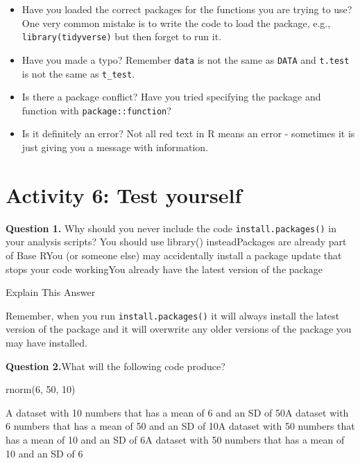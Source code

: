 \documentclass[
  oneside]{book}
\newenvironment{Shaded}{\begin{snugshade}}{\end{snugshade}}
\newcommand{\DecValTok}[1]{\textcolor[rgb]{0.00,0.00,0.81}{#1}}
\newcommand{\FunctionTok}[1]{\textcolor[rgb]{0.00,0.00,0.00}{#1}}
\newcommand{\NormalTok}[1]{#1}
\providecommand{\tightlist}{%
  \setlength{\itemsep}{0pt}\setlength{\parskip}{0pt}}
\begin{document}
\begin{itemize}
\tightlist
\item
  Have you loaded the correct packages for the functions you are trying to use? One very common mistake is to write the code to load the package, e.g., \texttt{library(tidyverse)} but then forget to run it.
\item
  Have you made a typo? Remember \texttt{data} is not the same as \texttt{DATA} and \texttt{t.test} is not the same as \texttt{t\_test}.
\item
  Is there a package conflict? Have you tried specifying the package and function with \texttt{package::function}?
\item
  Is it definitely an error? Not all red text in R means an error - sometimes it is just giving you a message with information.
\end{itemize}

\hypertarget{activity-6-test-yourself}{%
\section{Activity 6: Test yourself}\label{activity-6-test-yourself}}

\textbf{Question 1.} Why should you never include the code \texttt{install.packages()} in your analysis scripts? You should use library() insteadPackages are already part of Base RYou (or someone else) may accidentally install a package update that stops your code workingYou already have the latest version of the package

Explain This Answer

Remember, when you run \texttt{install.packages()} it will always install the latest version of the package and it will overwrite any older versions of the package you may have installed.

\textbf{Question 2.}What will the following code produce?

\begin{Shaded}
\begin{Highlighting}[]
\FunctionTok{rnorm}\NormalTok{(}\DecValTok{6}\NormalTok{, }\DecValTok{50}\NormalTok{, }\DecValTok{10}\NormalTok{)}
\end{Highlighting}
\end{Shaded}

A dataset with 10 numbers that has a mean of 6 and an SD of 50A dataset with 6 numbers that has a mean of 50 and an SD of 10A dataset with 50 numbers that has a mean of 10 and an SD of 6A dataset with 50 numbers that has a mean of 10 and an SD of 6
\end{document}
